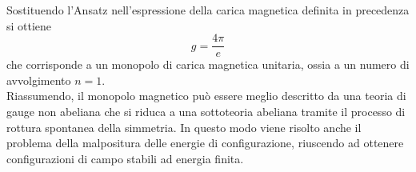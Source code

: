 Sostituendo l'Ansatz nell'espressione della carica magnetica definita in precedenza
si ottiene
\begin{equation}
   g = \frac{4\pi}{e}
\end{equation}
che corrisponde a un monopolo di carica magnetica unitaria, ossia a un
numero di avvolgimento $n = 1$.\\

Riassumendo, il monopolo magnetico può essere meglio descritto da una teoria di
gauge non abeliana che si riduca a una sottoteoria abeliana tramite il processo
di rottura spontanea della simmetria. In questo modo viene risolto anche il
problema della malpositura delle energie di configurazione, riuscendo ad ottenere
configurazioni di campo stabili ad energia finita.\\
